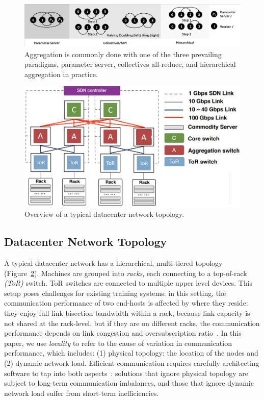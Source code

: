 \begin{figure}[t!]
	\centering
	\includegraphics[width=.7\linewidth, trim=2 3 3 3,clip]{Figures/aggregationapproaches.pdf}
	\caption{Aggregation is commonly done with one of the three prevailing paradigms, parameter server, collectives all-reduce, and hierarchical aggregation in practice.}
	\label{fig:aggregationapproaches}
\end{figure}


\begin{figure}[t!]
	\centering
	\includegraphics[width=.6\linewidth, trim=2 3 3 3,clip]{Figures/dc.png}
	\caption{Overview of a typical datacenter network topology.}
	\label{fig:dc}
\end{figure}


\subsection{Datacenter Network Topology}
\label{sec:datacenternetwork}
A typical datacenter network has a hierarchical, multi-tiered topology~\cite{Mysore2009PortLandAS,VL2,Roy2015InsideTS,incbricks} (Figure~\ref{fig:dc}). Machines are grouped into \textit{racks}, each connecting to a top-of-rack \textit{(ToR)} switch. ToR switches are connected to multiple upper level devices. This setup poses challenges for existing training systems: in this setting, the communication performance of two end-hosts is affected by where they reside: they enjoy full link bisection bandwidth within a rack, because link capacity is not shared at the rack-level, but if they are on different racks, the communication performance depends on link congestion and oversubscription ratio~\cite{Bilal2012ACS}. In this paper, we use \textit{locality} to refer to the cause of variation in communication performance, which includes: (1) physical topology: the location of the nodes and (2) dynamic network load. Efficient communication requires carefully architecting software to tap into both aspects~\cite{eyeQ, 27Octobe15:online}: solutions that ignore physical topology are subject to long-term communication imbalances, and those that ignore dynamic network load suffer from short-term inefficiencies.

